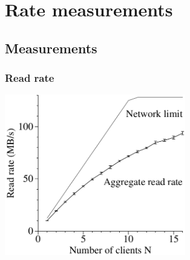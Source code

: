 \documentclass{beamer}
\begin{document}
\section{Rate measurements}
\subsection{Measurements}
\newcommand{\ratemesoption}{7cm}
\newcommand{\ratemehspace}{\hspace{15mm}}
\begin{frame}
 \frametitle{Read rate}
 \ratemehspace
 \includegraphics[height=\ratemesoption]{figures/GFSreads.png}
\end{frame}
\end{document}
